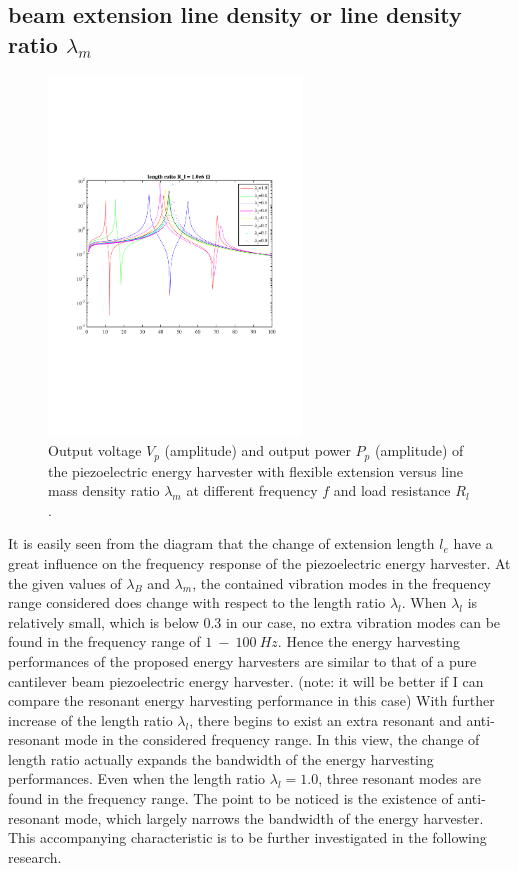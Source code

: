 \documentclass{elsarticle}
\begin{document}
\subsection{beam extension line density or line density ratio $\lambda_m$}


\begin{figure}[!htbp]
    \centering
    \includegraphics[width=0.6\textwidth]{./fig_laml_vol_versus_fr_Rl}
    \caption{Output voltage $V_p$ (amplitude) and output power $P_p$ (amplitude) of the piezoelectric energy harvester with flexible extension versus line mass density ratio $\lambda_m$ at different frequency $f$ and load resistance $R_l$. }
    \label{fig:fig_lamm_vol_versus_fr_Rl}
\end{figure}

It is easily seen from the diagram that the change of extension length $l_e$ have a great influence on the frequency response of the piezoelectric energy harvester. At the given values of $\lambda_B$ and $\lambda_m$, the contained vibration modes in the frequency range considered does change with respect to
the length ratio $\lambda_l$. When $\lambda_l$ is relatively small, which is below $0.3$ in our case, no extra vibration modes can be found in the frequency range of $1\ - \ 100\ Hz$. Hence the energy harvesting performances of the proposed energy harvesters are similar to that of a pure cantilever beam piezoelectric energy harvester. (note: it will be better if I can compare the resonant energy harvesting performance in this case) With further increase of the length ratio $\lambda_l$, there begins to exist an extra resonant and anti-resonant mode in the considered frequency range. In this view, the change of length ratio actually expands the bandwidth of the energy harvesting performances. Even when the length ratio $\lambda_l = 1.0$, three resonant modes are found in the frequency range. The point to be noticed is the existence of anti-resonant mode, which largely narrows the bandwidth of the energy harvester. This accompanying characteristic is to be further investigated in the following research. 
\end{document}
